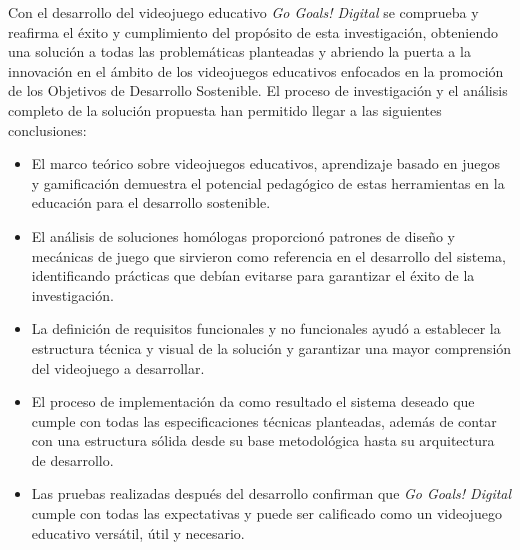 \conclusions

Con el desarrollo del videojuego educativo \textit{Go Goals! Digital} se comprueba y reafirma el éxito y cumplimiento del propósito de esta investigación, obteniendo una solución a todas las problemáticas planteadas y abriendo la puerta a la innovación en el ámbito de los videojuegos educativos enfocados en la promoción de los Objetivos de Desarrollo Sostenible. El proceso de investigación y el análisis completo de la solución propuesta han permitido llegar a las siguientes conclusiones:

\begin{itemize}
    \item El marco teórico sobre videojuegos educativos, aprendizaje basado en juegos y gamificación demuestra el potencial pedagógico de estas herramientas en la educación para el desarrollo sostenible.
    
    \item El análisis de soluciones homólogas proporcionó patrones de diseño y mecánicas de juego que sirvieron como referencia en el desarrollo del sistema, identificando prácticas que debían evitarse para garantizar el éxito de la investigación.
    
    \item La definición de requisitos funcionales y no funcionales ayudó a establecer la estructura técnica y visual de la solución y garantizar una mayor comprensión del videojuego a desarrollar.
    
    \item El proceso de implementación da como resultado el sistema deseado que cumple con todas las especificaciones técnicas planteadas, además de contar con una estructura sólida desde su base metodológica hasta su arquitectura de desarrollo.
    
    \item Las pruebas realizadas después del desarrollo confirman que \textit{Go Goals! Digital} cumple con todas las expectativas y puede ser calificado como un videojuego educativo versátil, útil y necesario.
\end{itemize}